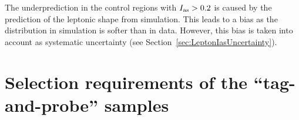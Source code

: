 \newpage 
The underprediction in the control regions with $I_{\text{as}}>0.2$ is caused by the prediction of the leptonic \ias shape from simulation.
This leads to a bias as the \ias distribution in simulation is softer than in data.
However, this bias is taken into account as systematic uncertainty (see Section~\ref{sec:LeptonIasUncertainty}).


\FloatBarrier
\section{Selection requirements of the ``tag-and-probe'' samples}
\label{app:TagAndProbeRequirements}


